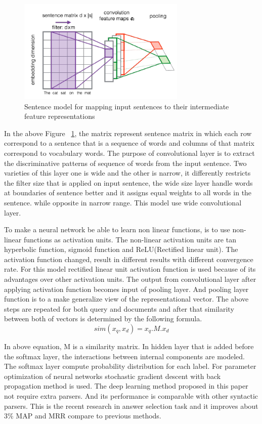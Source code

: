 \documentclass{doublecol-new}
\theoremstyle{TH}{
\newtheorem{lemma}{Lemma}
\newtheorem{theorem}[lemma]{Theorem}
\newtheorem{corrolary}[lemma]{Corrolary}
\newtheorem{conjecture}[lemma]{Conjecture}
\newtheorem{proposition}[lemma]{Proposition}
\newtheorem{claim}[lemma]{Claim}
\newtheorem{stheorem}[lemma]{Wrong Theorem}
\newtheorem{algorithm}{Algorithm}
}
\theoremstyle{THrm}{
\newtheorem{definition}{Definition}[section]
\newtheorem{question}{Question}[section]
\newtheorem{remark}{Remark}
\newtheorem{scheme}{Scheme}
}
\theoremstyle{THhit}{
\newtheorem{case}{Case}[section]
}
\begin{document}
\begin{figure}[h]
	\centerline{\includegraphics[width=8cm,keepaspectratio]{image/shortpair.PNG}}
	\caption{Sentence model for mapping input sentences to their intermediate feature representations}
	\label{fig:sentencemodel_shortpair}
\end{figure} 

In the above Figure ~\ref{fig:sentencemodel_shortpair}, the matrix represent sentence matrix in which each row correspond to a sentence that is a sequence of words and columns of that matrix correspond to vocabulary words. The purpose of convolutional layer is to extract the discriminative patterns of sequence of words from the input sentence. Two varieties of this layer one is wide and the other is narrow, it differently restricts the filter size that is applied on input sentence,  the wide size layer handle words at boundaries of sentence better and it assigns equal weights to all words in the sentence. while opposite in narrow range. This model use wide convolutional layer. 

To make a neural network be able to learn non linear functions, is to use non-linear functions as activation units. The non-linear activation units are tan hyperbolic function, sigmoid function and ReLU(Rectified linear unit). The activation function changed, result in different results with different convergence rate. For this model rectified linear unit activation function is used because of its advantages over other activation units. The output from convolutional layer after applying activation function becomes input of pooling layer. And pooling layer function is to a make generalize view of the representational vector. The above steps are repeated for both query and documents and after that similarity between both of vectors is determined by the following formula. 
\begin{equation}\label{key}
sim(x_{q},x_{d}) = x_{q}.M.x_{d}
\end{equation}

In above equation, M is a similarity matrix. In hidden layer that is added before the softmax layer, the interactions between internal components are modeled. The softmax layer compute probability distribution for each label. For parameter optimization of neural networks stochastic gradient descent with back propagation method is used. The deep learning method proposed in this paper not require extra parsers. And its performance is comparable with other syntactic parsers. This is the recent research in answer selection task and it improves about 3\% MAP and MRR compare to previous methods. 
\end{document}
